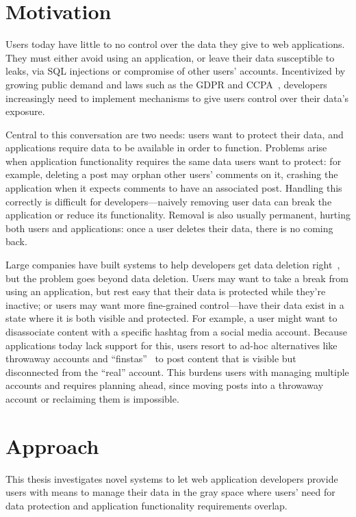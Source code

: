 \section{Motivation}
\label{sec:intro:motivation}
Users today have little to no control over the data they give to web
applications.  They must either avoid using an application, or leave their data
susceptible to leaks, \eg via SQL injections or compromise of other users'
accounts.  Incentivized by growing public demand and laws such as the GDPR and
CCPA~\cite{eu:gdpr, ccpa}, developers increasingly need to implement mechanisms
to give users control over their data’s exposure.

Central to this conversation are two needs: users want to protect their data,
and applications require data to be available in order to function. Problems
arise when application functionality requires the same data users want to
protect: for example, deleting a post may orphan other users' comments on it,
crashing the application when it expects comments to have an associated post.
Handling this correctly is difficult for developers---naively removing user data
can break the application or reduce its functionality. Removal is also usually
permanent, hurting both users and applications: once a user deletes their data,
there is no coming back.

Large companies have built systems to help developers get data deletion
right~\cite{delf}, but the problem goes beyond data deletion. Users may want to
take a break from using an application, but rest easy that their data is
protected while they’re inactive; or users may want more fine-grained
control—\ie have their data exist in a state where it is both visible and
protected. For example, a user might want to disassociate content with a
specific hashtag from a social media account. Because applications today lack
support for this, users resort to ad-hoc alternatives like throwaway accounts
and ``finstas''~\cite{reddit:throwaway, nytimes:finsta} to post content that is
visible but disconnected from the ``real'' account. This burdens users with
managing multiple accounts and requires planning ahead, since moving posts into
a throwaway account or reclaiming them is impossible.

\section{Approach}
\label{sec:intro:approach}
This thesis investigates novel systems to let web application developers provide
users with means to manage their data in the gray space where users' need for
data protection and application functionality requirements overlap.  

